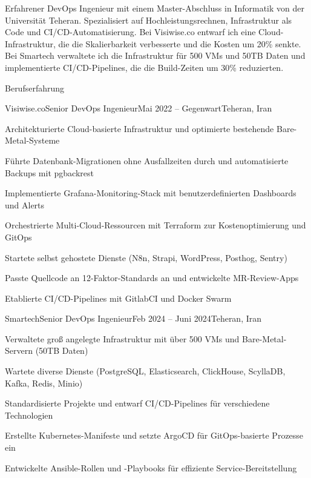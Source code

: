 \documentclass[]{main}
\begin{document}
\resumeheader
{}
{}
{}
{}
{}
{}

Erfahrener DevOps Ingenieur mit einem Master-Abschluss in Informatik von der Universität Teheran. Spezialisiert auf Hochleistungsrechnen, Infrastruktur als Code und CI/CD-Automatisierung. Bei Visiwise.co entwarf ich eine Cloud-Infrastruktur, die die Skalierbarkeit verbesserte und die Kosten um 20\% senkte. Bei Smartech verwaltete ich die Infrastruktur für 500 VMs und 50TB Daten und implementierte CI/CD-Pipelines, die die Build-Zeiten um 30\% reduzierten.

\begin{section}{Berufserfahrung}
 \begin{subsection}{Visiwise.co}{Senior DevOps Ingenieur}{Mai 2022 -- Gegenwart}{Teheran, Iran}
     \item Architekturierte Cloud-basierte Infrastruktur und optimierte bestehende Bare-Metal-Systeme
     \item Führte Datenbank-Migrationen ohne Ausfallzeiten durch und automatisierte Backups mit pgbackrest
     \item Implementierte Grafana-Monitoring-Stack mit benutzerdefinierten Dashboards und Alerts
     \item Orchestrierte Multi-Cloud-Ressourcen mit Terraform zur Kostenoptimierung und GitOps
     \item Startete selbst gehostete Dienste (N8n, Strapi, WordPress, Posthog, Sentry)
     \item Passte Quellcode an 12-Faktor-Standards an und entwickelte MR-Review-Apps
     \item Etablierte CI/CD-Pipelines mit GitlabCI und Docker Swarm
 \end{subsection}

 \begin{subsection}{Smartech}{Senior DevOps Ingenieur}{Feb 2024 -- Juni 2024}{Teheran, Iran}
     \item Verwaltete groß angelegte Infrastruktur mit über 500 VMs und Bare-Metal-Servern (50TB Daten)
     \item Wartete diverse Dienste (PostgreSQL, Elasticsearch, ClickHouse, ScyllaDB, Kafka, Redis, Minio)
     \item Standardisierte Projekte und entwarf CI/CD-Pipelines für verschiedene Technologien
     \item Erstellte Kubernetes-Manifeste und setzte ArgoCD für GitOps-basierte Prozesse ein
     \item Entwickelte Ansible-Rollen und -Playbooks für effiziente Service-Bereitstellung
 \end{subsection}


\end{section}
\end{document}
